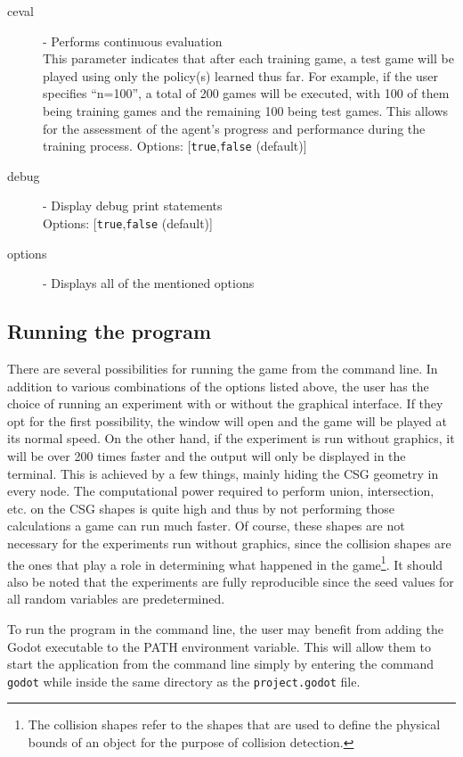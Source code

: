 \begin{description}
\item[ceval] - Performs continuous evaluation \label{opt:ceval}\\
This parameter indicates that after each training game, a test game will be played using only the policy(s) learned thus far. For example, if the user specifies ``n=100'', a total of 200 games will be executed, with 100 of them being training games and the remaining 100 being test games. This allows for the assessment of the agent's progress and performance during the training process. 
Options: [\texttt{true},\texttt{false} (default)]
\item[debug] - Display debug print statements \label{opt:debug}\\
Options: [\texttt{true},\texttt{false} (default)]
\item[options] - Displays all of the mentioned options \label{opt:options}\\
\end{description}

\subsection{Running the program}
There are several possibilities for running the game from the command line. In addition to various combinations of the options listed above, the user has the choice of running an experiment with or without the graphical interface. If they opt for the first possibility, the window will open and the game will be played at its normal speed. On the other hand, if the experiment is run without graphics, it will be over 200 times faster and the output will only be displayed in the terminal. This is achieved by a few things, mainly hiding the CSG geometry in every node. The computational power required to perform union, intersection, etc. on the CSG shapes is quite high and thus by not performing those calculations a game can run much faster. Of course, these shapes are not necessary for the experiments run without graphics, since the collision shapes are the ones that play a role in determining what happened in the game\footnote{The collision shapes refer to the shapes that are used to define the physical bounds of an object for the purpose of collision detection.}.
It should also be noted that the experiments are fully reproducible since the seed values for all random variables are predetermined.

To run the program in the command line, the user may benefit from adding the Godot executable to the PATH environment variable. This will allow them to start the application from the command line simply by entering the command \texttt{godot} while inside the same directory as the \texttt{project.godot} file.

